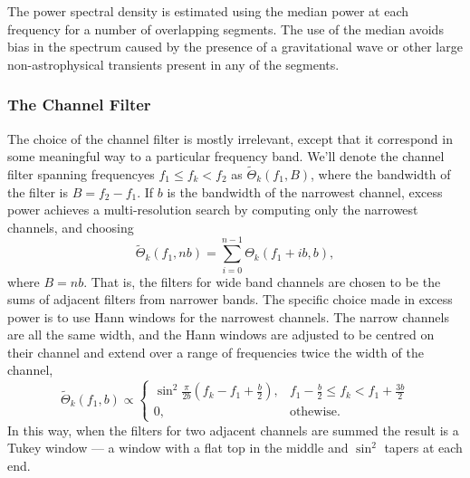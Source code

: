 \documentclass{article}
\begin{document}
The power spectral density is estimated using the median power at each
frequency for a number of overlapping segments.  The use of the median
avoids bias in the spectrum caused by the presence of a gravitational wave
or other large non-astrophysical transients present in any of the segments. 


\subsubsection{The Channel Filter}
\label{sec:channelfilter}


The choice of the channel filter is mostly irrelevant, except that it
correspond in some meaningful way to a particular frequency band.  We'll
denote the channel filter spanning frequencyes \(f_{1} \leq f_{k} < f_{2}\)
as \(\tilde{\Theta}_{k}(f_{1}, B)\), where the bandwidth of the filter is
\(B = f_{2} - f_{1}\).  If \(b\) is the bandwidth of the narrowest channel,
excess power achieves a multi-resolution search by computing only the
narrowest channels, and choosing
\begin{equation}
\tilde{\Theta}_{k}(f_{1}, n b)
   = \sum_{i = 0}^{n - 1} \Theta_{k}(f_{1} + i b, b),
\end{equation}
where \(B = n b\).  That is, the filters for wide band channels are chosen
to be the sums of adjacent filters from narrower bands.  The specific
choice made in excess power is to use Hann windows for the narrowest
channels.  The narrow channels are all the same width, and the Hann windows
are adjusted to be centred on their channel and extend over a range of
frequencies twice the width of the channel,
\begin{equation}
\tilde{\Theta}_{k}(f_{1}, b)
   \propto \begin{cases}
   \sin^{2} \frac{\pi}{2 b} (f_{k} - f_{1} + \frac{b}{2}), & f_{1} -
   \frac{b}{2} \leq f_{k} < f_{1} + \frac{3 b}{2} \\
   0, & \text{othewise}.
   \end{cases}
\end{equation}
In this way, when the filters for two adjacent channels are summed the
result is a Tukey window --- a window with a flat top in the middle and
\(\sin^{2}\) tapers at each end.
\end{document}
